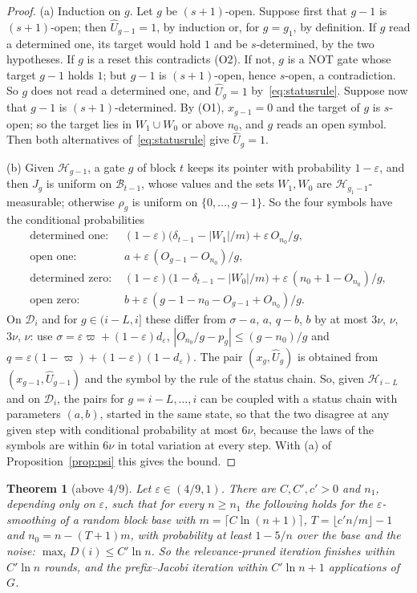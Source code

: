 \documentclass[11pt]{amsart}
\newtheorem{theorem}{Theorem}
\theoremstyle{definition}
\theoremstyle{remark}
\newcommand{\eps}{\varepsilon}
\begin{document}
\begin{proof}
(a) Induction on $g$. Let $g$ be $(s+1)$-open. Suppose first that $g-1$ is $(s+1)$-open; then
$\hat U_{g-1}=1$, by induction or, for $g=g_1$, by definition. If $g$ read a determined one, its
target would hold $1$ and be $s$-determined, by the two hypotheses. If $g$ is a reset this
contradicts (O2). If not, $g$ is a NOT gate whose target $g-1$ holds $1$; but $g-1$ is
$(s+1)$-open, hence $s$-open, a contradiction. So $g$ does not read a determined one, and
$\hat U_g=1$ by~\eqref{eq:statusrule}. Suppose now that $g-1$ is $(s+1)$-determined. By (O1),
$x_{g-1}=0$ and the target of $g$ is $s$-open; so the target lies in $W_1\cup W_0$ or above $n_0$,
and $g$ reads an open symbol. Then both alternatives of~\eqref{eq:statusrule} give $\hat U_g=1$.

(b) Given $\mathcal H_{g-1}$, a gate $g$ of block $t$ keeps its pointer with probability $1-\eps$,
and then $J_g$ is uniform on $\mathcal B_{t-1}$, whose values and the sets $W_1,W_0$ are
$\mathcal H_{g_1-1}$-measurable; otherwise $\rho_g$ is uniform on $\{0,\dots,g-1\}$. So the four
symbols have the conditional probabilities
\begin{align*}
\text{determined one: }&(1-\eps)\bigl(\delta_{t-1}-|W_1|/m\bigr)+\eps\,O_{n_0}/g,\\
\text{open one: }&a+\eps\,(O_{g-1}-O_{n_0})/g,\\
\text{determined zero: }&(1-\eps)\bigl(1-\delta_{t-1}-|W_0|/m\bigr)+\eps\,(n_0+1-O_{n_0})/g,\\
\text{open zero: }&b+\eps\,(g-1-n_0-O_{g-1}+O_{n_0})/g .
\end{align*}
On $\mathcal D_i$ and for $g\in(i-L,i]$ these differ from $\sigma-a$, $a$, $q-b$, $b$ by at most
$3\nu$, $\nu$, $3\nu$, $\nu$: use $\sigma=\eps\varpi+(1-\eps)d_\eps$,
$|O_{n_0}/g-p_g|\le(g-n_0)/g$ and $q=\eps(1-\varpi)+(1-\eps)(1-d_\eps)$. The pair
$(x_g,\hat U_g)$ is obtained from $(x_{g-1},\hat U_{g-1})$ and the symbol by the rule of the
status chain. So, given $\mathcal H_{i-L}$ and on $\mathcal D_i$, the pairs for
$g=i-L,\dots,i$ can be coupled with a status chain with parameters $(a,b)$, started in the same
state, so that the two disagree at any given step with conditional probability at most $6\nu$,
because the laws of the symbols are within $6\nu$ in total variation at every step. With (a) of
Proposition~\ref{prop:psi} this gives the bound.
\end{proof}

\begin{theorem}[above $4/9$]\label{thm:blockabove}
Let $\eps\in(4/9,1)$. There are $C,C',c'>0$ and $n_1$, depending only on $\eps$, such that for
every $n\ge n_1$ the following holds for the $\eps$-smoothing of a random block base with
$m=\lceil C\ln(n+1)\rceil$, $T=\lfloor c'n/m\rfloor-1$ and $n_0=n-(T+1)m$, with probability at
least $1-5/n$ over the base and the noise: $\max_iD(i)\le C'\ln n$. So the relevance-pruned
iteration finishes within $C'\ln n$ rounds, and the prefix--Jacobi iteration within
$C'\ln n+1$ applications of $G$.
\end{theorem}
\end{document}
